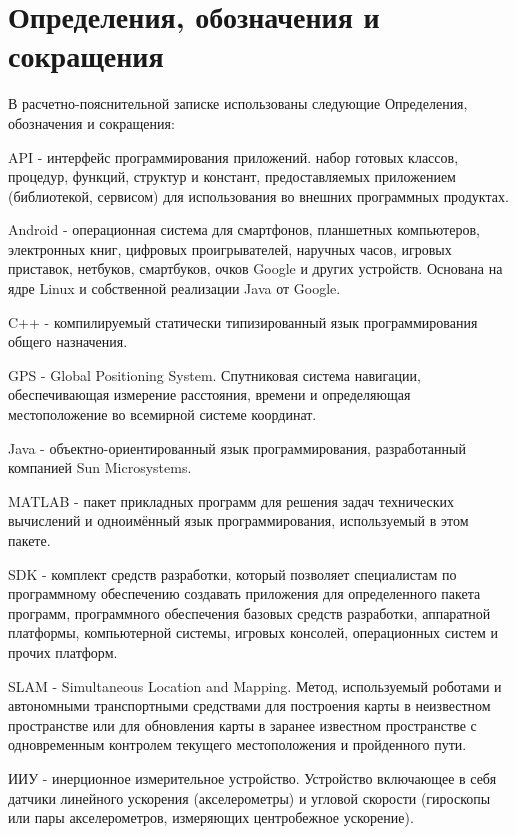 \newpage
\section*{Определения, обозначения и сокращения}

В расчетно-пояснительной записке использованы следующие Определения, обозначения и сокращения:

API - интерфейс программирования приложений. набор готовых классов, процедур, функций, структур и констант, предоставляемых приложением (библиотекой, сервисом) для использования во внешних программных продуктах.

Android -  операционная система для смартфонов, планшетных компьютеров, электронных книг, цифровых проигрывателей, наручных часов, игровых приставок, нетбуков, смартбуков, очков Google и других устройств. Основана на ядре Linux и собственной реализации Java от Google.

C++ - компилируемый статически типизированный язык программирования общего назначения.

GPS - Global Positioning System.  Спутниковая система навигации, обеспечивающая измерение расстояния, времени и определяющая местоположение во всемирной системе координат. 

Java -  объектно-ориентированный язык программирования, разработанный компанией Sun Microsystems.

MATLAB -  пакет прикладных программ для решения задач технических вычислений и одноимённый язык программирования, используемый в этом пакете.

SDK - комплект средств разработки, который позволяет специалистам по программному обеспечению создавать приложения для определенного пакета программ, программного обеспечения базовых средств разработки, аппаратной платформы, компьютерной системы, игровых консолей, операционных систем и прочих платформ.

SLAM - Simultaneous Location and Mapping. Метод, используемый роботами и автономными транспортными средствами для построения карты в неизвестном пространстве или для обновления карты в заранее известном пространстве с одновременным контролем текущего местоположения и пройденного пути.

ИИУ - инерционное измерительное устройство. Устройство включающее в себя датчики линейного ускорения (акселерометры) и угловой скорости (гироскопы или пары акселерометров, измеряющих центробежное ускорение).  
 
